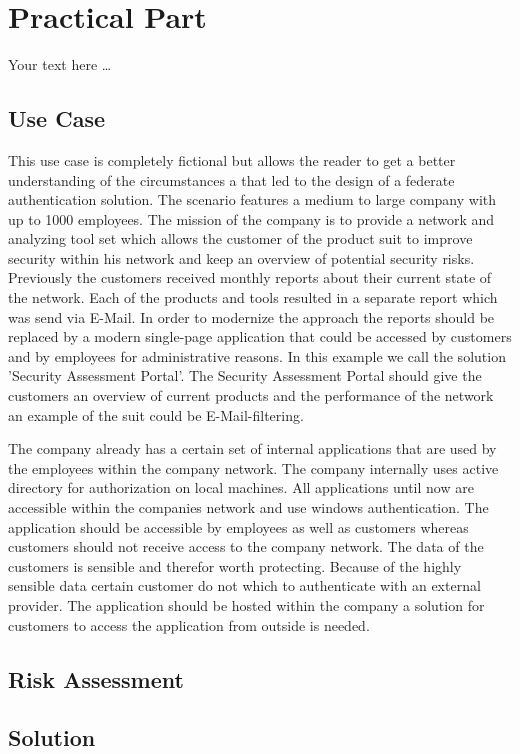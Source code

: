 \chapter{Practical Part}\label{chap:practicalPart}
\chapterstart

Your text here \ldots
\section{Use Case}
This use case is completely fictional but allows the reader to get a better understanding of the circumstances a that led to the design of a federate authentication solution. The scenario features a medium to large company with up to 1000 employees. The mission of the company is to provide a network and analyzing tool set which allows the customer of the product suit to improve security within his network and keep an overview of potential security risks. Previously the customers received monthly reports about their current state of the network. Each of the products and tools resulted in a separate report which was send via E-Mail. In order to modernize the approach the reports should be replaced by a modern single-page application that could be accessed by customers and by employees for administrative reasons. In this example we call the solution 'Security Assessment Portal'. The Security Assessment Portal should give the customers an overview of current products and the performance of the network an example of the suit could be E-Mail-filtering.  

The company already has a certain set of internal applications that are used by the employees within the company network. The company internally uses active directory for authorization on local machines. All applications until now are accessible within the companies network and use windows authentication. The application should be accessible by employees as well as customers whereas customers should not receive access to the company network. The data of the customers is sensible and therefor worth protecting. Because of the highly sensible data certain customer do not which to authenticate with an external provider. The application should be hosted within the company a solution for customers to access the application from outside is needed. 

\section{Risk Assessment}



\section{Solution}


\chapterend
